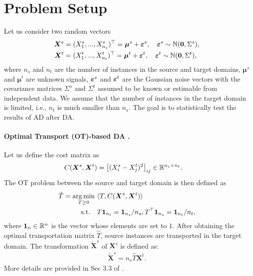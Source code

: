 \section{Problem Setup} \label{sec:problem_setup}

Let us consider two random vectors
%
\begin{align*} 
	\bm X^s &= (X^s_1, ..., X^s_{n_s})^\top = \bm \mu^s  + \bm {\varepsilon}^s, \quad \bm {\varepsilon}^s \sim \mathbb{N}(\bm 0, \Sigma^s), 
	\\ 
	\bm X^t &= (X^t_1, ..., X^t_{n_t})^\top = \bm \mu^t  + \bm {\varepsilon}^t, \quad \bm {\varepsilon}^t \sim \mathbb{N}(\bm 0, \Sigma^t), 
\end{align*}
%
where $n_s$ and $n_t$ are the number of instances in the source and target domains, $\bm \mu^s$ and $\bm \mu^t$ are unknown signals, $\bm {\varepsilon}^s$ and $\bm {\varepsilon}^t$ are the Gaussian noise vectors with the covariance matrices $\Sigma^s$ and $\Sigma^t$ assumed to be known or estimable from independent data. 
%
We assume that the number of instances in the target domain is limited, i.e., $n_t$ is much smaller than $n_s$.
%
The goal is to statistically test the results of AD after DA.

\paragraph{Optimal Transport (OT)-based DA \cite{flamary2016optimal}.} 
%
Let us define the cost matrix as 
%
\begin{align*} %
	C(\bm X^s, \bm X^t) 
	& = \big[(X_i^s - X_j^t)^2 \big]_{ij} \in \RR^{n_s \times n_t}.
\end{align*}
%
The OT problem between the source and target domain is then defined as 
\begin{align} \label{eq:ot_problem}
		\hat{T} = \operatorname*{arg\,min} \limits_{T \geq 0} & ~ \langle T, C(\bm X^s, \bm X^t)\rangle \\ 
		\text{s.t.} ~~& ~ T \bm{1}_{n_t} = \bm 1_{n_s}/{n_s},  T^\top \bm{1}_{n_s} = \bm 1_{n_t}/{n_t} \nonumber,
\end{align}
%
where $\bm{1}_n \in \mathbb{R}^n$ is the vector whose elements are set to $1$.
%
After obtaining the optimal transportation matrix $\hat{T}$, source instances are transported in the target domain.
%
The transformation $\tilde{\bm X}^s$ of $\bm X^s$ is defined as:
\begin{align*}
	\tilde{\bm X}^s 
		= n_s \hat{T} \bm X^t.
\end{align*} 
%
More details are provided in Sec 3.3 of \cite{flamary2016optimal}. 

